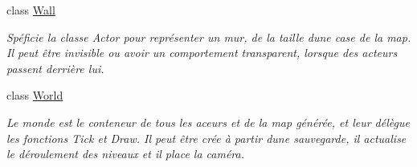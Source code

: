 \begin{DoxyCompactItemize}
class \hyperlink{class_tentacle_slicers_1_1maps_1_1_wall}{Wall}
\begin{DoxyCompactList}\small\item\em Spéficie la classe Actor pour représenter un mur, de la taille d\textquotesingle{}une case de la map. Il peut être invisible ou avoir un comportement transparent, lorsque des acteurs passent derrière lui. \end{DoxyCompactList}\item 
class \hyperlink{class_tentacle_slicers_1_1maps_1_1_world}{World}
\begin{DoxyCompactList}\small\item\em Le monde est le conteneur de tous les aceurs et de la map générée, et leur délègue les fonctions Tick et Draw. Il peut être crée à partir d\textquotesingle{}une sauvegarde, il actualise le déroulement des niveaux et il place la caméra. \end{DoxyCompactList}\end{DoxyCompactItemize}

